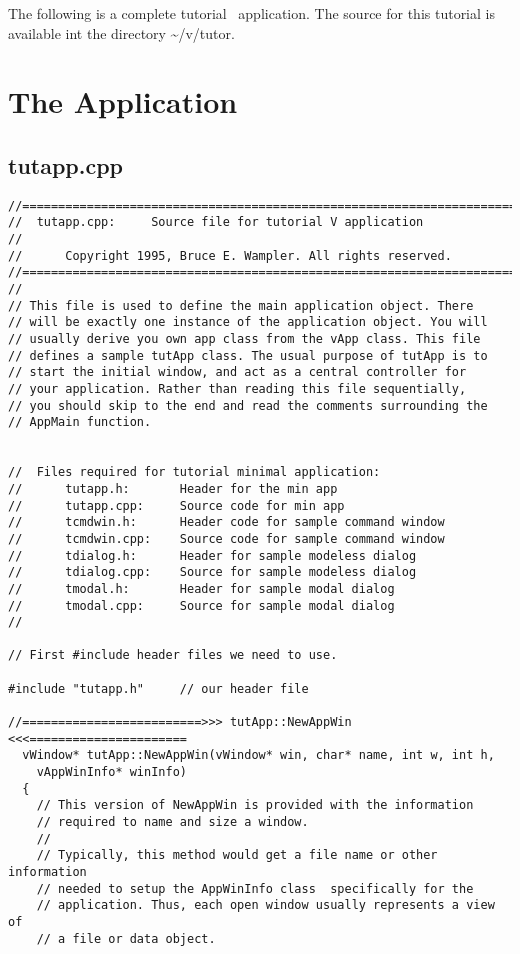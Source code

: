 The following is a complete tutorial \V\ application. The source for
this tutorial is available int the directory \~{}/v/tutor.

\section{The Application}

\subsection*{tutapp.cpp}

%

\footnotesize
\begin{verbatim}
//========================================================================
//  tutapp.cpp:     Source file for tutorial V application
//
//      Copyright 1995, Bruce E. Wampler. All rights reserved.
//========================================================================
//
// This file is used to define the main application object. There
// will be exactly one instance of the application object. You will
// usually derive you own app class from the vApp class. This file
// defines a sample tutApp class. The usual purpose of tutApp is to
// start the initial window, and act as a central controller for
// your application. Rather than reading this file sequentially,
// you should skip to the end and read the comments surrounding the
// AppMain function.


//  Files required for tutorial minimal application:
//      tutapp.h:       Header for the min app
//      tutapp.cpp:     Source code for min app
//      tcmdwin.h:      Header code for sample command window
//      tcmdwin.cpp:    Source code for sample command window
//      tdialog.h:      Header for sample modeless dialog
//      tdialog.cpp:    Source for sample modeless dialog
//      tmodal.h:       Header for sample modal dialog
//      tmodal.cpp:     Source for sample modal dialog
//

// First #include header files we need to use.

#include "tutapp.h"     // our header file

//=========================>>> tutApp::NewAppWin <<<======================
  vWindow* tutApp::NewAppWin(vWindow* win, char* name, int w, int h,
    vAppWinInfo* winInfo)
  {
    // This version of NewAppWin is provided with the information
    // required to name and size a window.
    // 
    // Typically, this method would get a file name or other information
    // needed to setup the AppWinInfo class  specifically for the
    // application. Thus, each open window usually represents a view of
    // a file or data object.


\end{verbatim}
